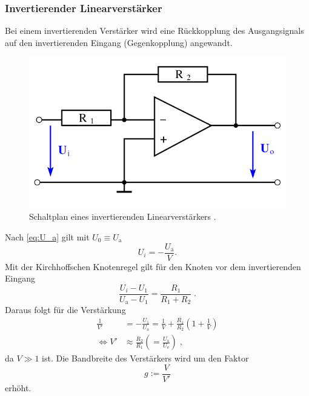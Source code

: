 \subsubsection{Invertierender Linearverstärker}
Bei einem invertierenden Verstärker wird eine Rückkopplung des Ausgangsignals auf den invertierenden Eingang (Gegenkopplung) angewandt.
\begin{figure}
    \centering
    \includegraphics[width = .5\textwidth]{"content/pics/inverting.png"}
    \caption{Schaltplan eines invertierenden Linearverstärkers \cite{v51}.}
    \label{fig:inverting}
\end{figure}
Nach \autoref{eq:U_a} gilt mit $U_0 \equiv U_\text{a}$ 
\begin{equation*}
U_i = -\frac{U_\text{a}}{V}.
\end{equation*}
Mit der Kirchhoffschen Knotenregel gilt für den Knoten vor dem invertierenden Eingang 
\begin{equation*}
    \frac{U_i - U_1}{U_\text{a} - U_1} = \frac{R_1}{R_1 + R_2}\;.
\end{equation*}
Daraus folgt für die Verstärkung 
\begin{align}
    \frac{1}{V'} &= -\frac{U_1}{U_\text{a}} = \frac{1}{V} + \frac{R_1}{R_2}\left(1 + \frac{1}{V}\right) \nonumber \\
    \Leftrightarrow V' &\approx \frac{R_2}{R_1} \left( = \frac{U_\text{a}}{U_\text{e}}\right) \;,
    \label{eq:invert}
\end{align}
da $V \gg 1$ ist.
Die Bandbreite des Verstärkers wird um den Faktor 
\begin{equation}
    g := \frac{V}{V'}
\end{equation}
erhöht.

